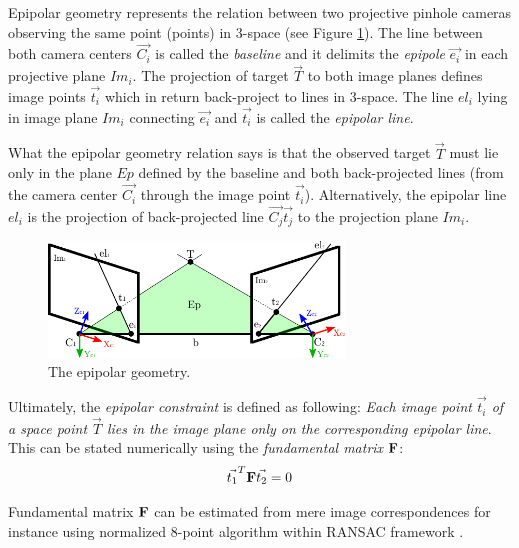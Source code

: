 Epipolar geometry represents the relation between two projective pinhole cameras observing the same point (points) in 3-space \cite{Cyganek:2007:ICV:1214366} (see Figure \ref{fig:epipolar_geometry}). The line between both camera centers $\vec{C_{i}}$ is called the \textit{baseline} and it delimits the \textit{epipole} $ \vec{e_{i}}$ in each projective plane $Im_{i}$. The projection of target $\vec{T}$ to both image planes defines image points $\vec{t_{i}}$ which in return back-project to lines in 3-space. The line $el_{i}$ lying in image plane $Im_{i}$ connecting $\vec{e_{i}}$ and ${\vec{t_{i}}}$ is called the \textit{epipolar line}.

What the epipolar geometry relation says is that the observed target $\vec{T}$ must lie only in the plane $Ep$ defined by the baseline and both back-projected lines (from the camera center $\vec{C_{i}}$ through the image point $\vec{t_{i}}$). Alternatively, the epipolar line $el_{i}$ is the projection of back-projected line $\vec{C_{j}}\vec{t_{j}}$ to the projection plane $Im_{i}$.

\begin{figure}[tbh]
	\centering
	\includegraphics[width=0.7\textwidth]{fig/epipolar_geometry.pdf}
	\caption{The epipolar geometry.}
	\label{fig:epipolar_geometry}
\end{figure}

Ultimately, the \textit{epipolar constraint} is defined as following: \textit{Each image point $\vec{t_{i}}$ of a space point $\vec{T}$ lies in the image plane only on the corresponding epipolar line}. This can be stated numerically using the \textit{fundamental matrix} $\mathbf{F}$:
\begin{align}
	\vec{t_{1}}^{T}\mathbf{F}\vec{t_{2}} = 0
\end{align}

Fundamental matrix $\mathbf{F}$ can be estimated from mere image correspondences for instance using normalized 8-point algorithm within RANSAC framework \cite{Hartley:2003:MVG:861369, Cyganek:2007:ICV:1214366}.

